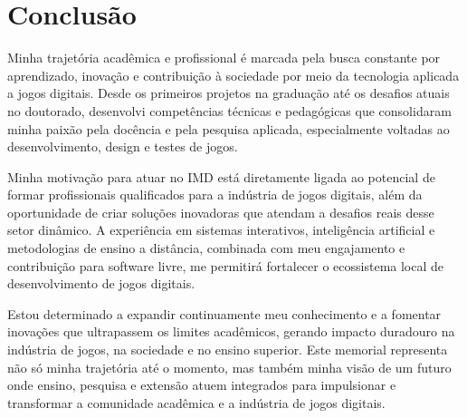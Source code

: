 \documentclass[10pt,a4paper,oneside]{book}
\begin{document}
\chapter{Conclusão}
\label{cap_conclusao}

Minha trajetória acadêmica e profissional é marcada pela busca constante por aprendizado, inovação e contribuição à
sociedade por meio da tecnologia aplicada a jogos digitais. Desde os primeiros projetos na graduação até os desafios
atuais no doutorado, desenvolvi competências técnicas e pedagógicas que consolidaram minha paixão pela docência e pela
pesquisa aplicada, especialmente voltadas ao desenvolvimento, design e testes de jogos.


Minha motivação para atuar no IMD está diretamente ligada ao potencial de formar profissionais qualificados para a
indústria de jogos digitais, além da oportunidade de criar soluções inovadoras que atendam a desafios reais desse setor
dinâmico. A experiência em sistemas interativos, inteligência artificial e metodologias de ensino a distância,
combinada com meu engajamento e contribuição para software livre, me permitirá fortalecer o ecossistema local de desenvolvimento de jogos digitais.


Estou determinado a expandir continuamente meu conhecimento e a fomentar inovações que ultrapassem os limites acadêmicos,
gerando impacto duradouro na indústria de jogos, na sociedade e no ensino superior. Este memorial representa não só minha
trajetória até o momento, mas também minha visão de um futuro onde ensino, pesquisa e extensão atuem integrados para
impulsionar e transformar a comunidade acadêmica e a indústria de jogos digitais.



\backmatter


\end{document}
